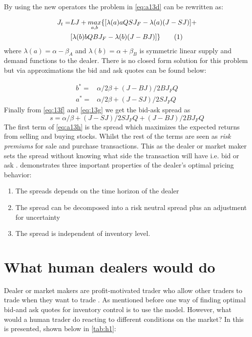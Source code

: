 \documentclass{kththesis}
\theoremstyle{definition}
\newcommand\numberthis{\addtocounter{equation}{1}\tag{\theequation}}
\begin{document}
By using the new operators the problem in \autoref{eq:a13d} can be rewritten as:

\begin{align*}
    \label{eq:a13e2}
    J_{t} = & LJ + \underset{a,b}{max}\{[\lambda(a)aQSJ_{F} - \lambda(a)(J-SJ)] + \\
    & [\lambda(b)bQBJ_{F} - \lambda(b)(J-BJ)]\} 
    \numberthis
\end{align*}
where $\lambda(a) = \alpha - \beta_{A}$ and $\lambda(b) = \alpha + \beta_{B} $ is symmetric linear supply and demand functions to the dealer. There is no closed form solution for this problem but via approximations the bid and ask quotes can be found below:

\begin{align}
\label{eq:a13f}
    b^{*} = & \alpha/2\beta + (J-BJ)/2BJ_{F}Q \\
    a^{*} = & \alpha/2\beta + (J-SJ)/2SJ_{F}Q \label{eq:a13g}
\end{align}
Finally from \autoref{eq:13f} and \autoref{eq:13g} we get the bid-ask spread as
\begin{equation}
    \label{eq:a13h}
    s = \alpha / \beta + (J-SJ)/2SJ_{F}Q + (J-BJ)/2BJ_{F}Q
\end{equation}
The first term of \autoref{eq:a13h} is the spread which maximizes the expected returns from selling and buying stocks. Whilst the rest of the terms are seen as \textit{risk premiums} for sale and purchase transactions. This as the dealer or market maker sets the spread without knowing what side the transaction will have i.e. bid or ask \parencite{ho1981optimal}.
\newline
\newline
\textcite{ho1981optimal} demonstrates three important properties of the dealer's optimal pricing behavior:

\begin{enumerate}
    \item The spreads depends on the time horizon of the dealer
    \item The spread can be decomposed into a risk neutral spread plus an adjustment for uncertainty
    \item The spread is independent of inventory level.
\end{enumerate}

\section{What human dealers would do}
Dealer or market makers are profit-motivated trader who allow other traders to trade when they want to trade \parencite{harris2003trading}. As mentioned before one way of finding optimal bid-and ask quotes for inventory control is to use the \textcite{ho1981optimal} model. However, what would a human trader do reacting to different conditions on the market? In \textcite{harris2003trading} this is presented, shown below in \autoref{tab:h1}:
\end{document}
